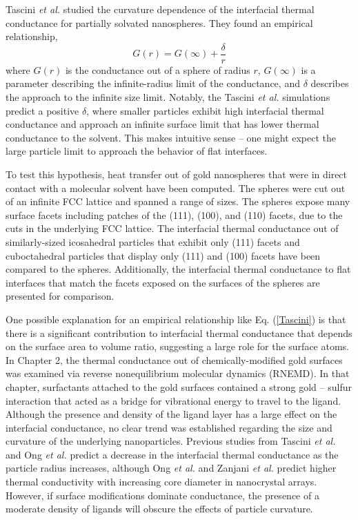 Tascini \textit{et al.}\cite{Tascini2016} studied the
curvature dependence of the interfacial thermal conductance for
partially solvated nanospheres. They found an empirical relationship,
\begin{equation}
G(r) = G(\infty) + \frac{\delta}{r}
\label{Tascini}
\end{equation}
where $G(r)$ is the conductance out of a sphere of radius $r$,
$G(\infty)$ is a parameter describing the infinite-radius limit of the
conductance, and $\delta$ describes the approach to the infinite size
limit. Notably, the Tascini \textit{et al.} simulations predict a
positive $\delta$, where smaller particles exhibit high interfacial
thermal conductance and approach an infinite surface limit that has
lower thermal conductance to the solvent. This makes intuitive sense
-- one might expect the large particle limit to approach the behavior
of flat interfaces.

To test this hypothesis, heat transfer out of gold
nanospheres that were in direct contact with a molecular solvent have been computed. The
spheres were cut out of an infinite FCC lattice and spanned a range of
sizes.  The spheres
expose many surface facets including patches of the (111), (100), and
(110) facets, due to the cuts in the underlying FCC lattice.
The interfacial thermal conductance out of similarly-sized
 icosahedral particles that exhibit only (111) facets and cuboctahedral particles that display
only (111) and (100) facets have been compared to the spheres. 
Additionally, the interfacial thermal conductance to flat interfaces 
that match the facets exposed on the surfaces of the spheres are presented
for comparison.

One possible explanation for an empirical relationship like
Eq. (\ref{Tascini}) is that there is a significant contribution to
interfacial thermal conductance that depends on the surface area to
volume ratio, suggesting a large role for the surface atoms. In 
Chapter 2, the thermal conductance out of chemically-modified gold
surfaces was examined via reverse nonequilibrium molecular dynamics
(RNEMD). \cite{kuang:AuThl,Stocker:2014qq,Stocker2016} %
In that chapter, surfactants attached to the gold surfaces contained
a strong gold -- sulfur interaction that acted as a bridge for
vibrational energy to travel to the ligand.  Although the presence and
density of the ligand layer has a large effect on the interfacial
conductance, no clear trend was established regarding the size and
curvature of the underlying nanoparticles. Previous studies from
Tascini \textit{et al.}\cite{Tascini2016} and Ong \textit{et
  al.}\cite{Ong:2014yq} predict a decrease in the interfacial thermal
conductance as the particle radius increases, although Ong \textit{et
  al.}\cite{Ong:2014yq} and Zanjani \textit{et al.}\cite{Zanjani2014}
predict higher thermal conductivity with increasing core diameter in
nanocrystal arrays. However, if surface modifications dominate
conductance, the presence of a moderate density of ligands will
obscure the effects of particle curvature.


